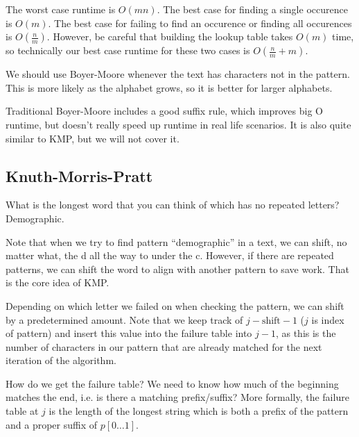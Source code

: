 \documentclass[a4paper]{article}
\begin{document}
The worst case runtime is \( O(mn) \). The best case for finding a single occurence is \( O(m) \). The best case for failing to find an occurence or finding all occurences is \( O(\frac{n}{m}) \). However, be careful that building the lookup table takes \( O(m) \) time, so technically our best case runtime for these two cases is \( O(\frac{n}{m} +m) \).

\begin{note}
	We should use Boyer-Moore whenever the text has characters not in the pattern. This is more likely as the alphabet grows, so it is better for larger alphabets. 
\end{note}

Traditional Boyer-Moore includes a good suffix rule, which improves big O runtime, but doesn't really speed up runtime in real life scenarios. It is also quite similar to KMP, but we will not cover it.

\subsection{Knuth-Morris-Pratt}

What is the longest word that you can think of which has no repeated letters? Demographic.

Note that when we try to find pattern	``demographic'' in a text, we can shift, no matter what, the d all the way to under the c. However, if there are repeated patterns, we can shift the word to align with another pattern to save work. That is the core idea of KMP.


Depending on which letter we failed on when checking the pattern, we can shift by a predetermined amount. Note that we keep track of \( j - \text{shift} - 1 \) (\( j \) is index of pattern) and insert this value into the failure table into \( j-1 \), as this is the number of characters in our pattern that are already matched for the next iteration of the algorithm.

How do we get the failure table? We need to know how much of the beginning matches the end, i.e. is there a matching prefix/suffix? More formally, the failure table at \( j \) is the length of the longest string which is both a prefix of the pattern and a proper suffix of \( p[0\ldots 1] \).
\end{document}
